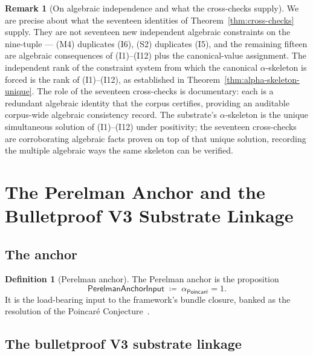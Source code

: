 \documentclass[11pt,a4paper]{amsart}
\theoremstyle{plain}
\theoremstyle{definition}
\newtheorem{definition}[theorem]{Definition}
\newtheorem{remark}[theorem]{Remark}
\begin{document}
\begin{remark}[On algebraic independence and what the cross-checks supply]\label{rem:cross-checks-role}
We are precise about what the seventeen identities of Theorem~\ref{thm:cross-checks} supply. They are not seventeen new independent algebraic constraints on the nine-tuple --- (M4) duplicates (I6), (S2) duplicates (I5), and the remaining fifteen are algebraic consequences of (I1)--(I12) plus the canonical-value assignment. The independent rank of the constraint system from which the canonical $\alpha$-skeleton is forced is the rank of (I1)--(I12), as established in Theorem~\ref{thm:alpha-skeleton-unique}. The role of the seventeen cross-checks is documentary: each is a redundant algebraic identity that the corpus certifies, providing an auditable corpus-wide algebraic consistency record. The substrate's $\alpha$-skeleton is the unique simultaneous solution of (I1)--(I12) under positivity; the seventeen cross-checks are corroborating algebraic facts proven on top of that unique solution, recording the multiple algebraic ways the same skeleton can be verified.
\end{remark}

\section{The Perelman Anchor and the Bulletproof V3 Substrate Linkage}\label{sec:perelman-anchor}

\subsection{The anchor}

\begin{definition}[Perelman anchor]\label{def:perelman-anchor}
The Perelman anchor is the proposition
\[
\textsf{PerelmanAnchorInput} \;\coloneqq\; \alpha_{\textsf{Poincar\'e}} = 1.
\]
It is the load-bearing input to the framework's bundle closure, banked as the resolution of the Poincar\'e Conjecture~\cite{perelman2003}.
\end{definition}

\subsection{The bulletproof V3 substrate linkage}
\end{document}
